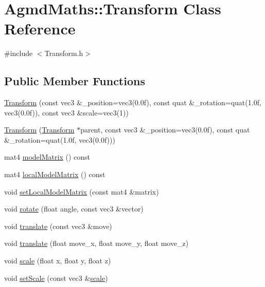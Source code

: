 \hypertarget{class_agmd_maths_1_1_transform}{\section{Agmd\+Maths\+:\+:Transform Class Reference}
\label{class_agmd_maths_1_1_transform}
}


{\ttfamily \#include $<$Transform.\+h$>$}

\subsection*{Public Member Functions}
\begin{DoxyCompactItemize}
\item 
\hyperlink{class_agmd_maths_1_1_transform_aade6c5a38c2998d80d4dfff20a9ac312}{Transform} (const vec3 \&\+\_\+position=vec3(0.\+0f), const quat \&\+\_\+rotation=quat(1.\+0f, vec3(0.\+0f)), const vec3 \&scale=vec3(1))
\item 
\hyperlink{class_agmd_maths_1_1_transform_aa39bf7c38505fedfdf209a795ad0e585}{Transform} (\hyperlink{class_agmd_maths_1_1_transform}{Transform} $\ast$parent, const vec3 \&\+\_\+position=vec3(0.\+0f), const quat \&\+\_\+rotation=quat(1.\+0f, vec3(0.\+0f)))
\item 
mat4 \hyperlink{class_agmd_maths_1_1_transform_a10bb16e4f3dc5555d2684384526da320}{model\+Matrix} () const 
\item 
mat4 \hyperlink{class_agmd_maths_1_1_transform_a17a66b12dee563680c1f892c01d85942}{local\+Model\+Matrix} () const 
\item 
void \hyperlink{class_agmd_maths_1_1_transform_a02af45f9d01f746cdf4995e63710915e}{set\+Local\+Model\+Matrix} (const mat4 \&matrix)
\item 
void \hyperlink{class_agmd_maths_1_1_transform_af8193d7ee91c39dfadbeb2b290489e93}{rotate} (float angle, const vec3 \&vector)
\item 
void \hyperlink{class_agmd_maths_1_1_transform_ab23a8a7ff9a6f47be3976276a4d86a05}{translate} (const vec3 \&move)
\item 
void \hyperlink{class_agmd_maths_1_1_transform_a236cc03dc9140fe79c7061a21150d7a0}{translate} (float move\+\_\+x, float move\+\_\+y, float move\+\_\+z)
\item 
void \hyperlink{class_agmd_maths_1_1_transform_a3b83e0b351d7010f30d7fed4a37fd2f9}{scale} (float x, float y, float z)
\item 
void \hyperlink{class_agmd_maths_1_1_transform_ac39fae3bdf45fc054a0a802fbbce638a}{set\+Scale} (const vec3 \&\hyperlink{class_agmd_maths_1_1_transform_a3b83e0b351d7010f30d7fed4a37fd2f9}{scale})

\end{DoxyCompactItemize}
